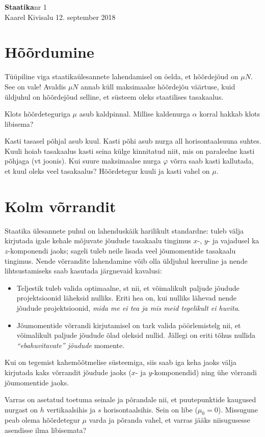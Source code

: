 \documentclass[a4paper,11pt,twocolumn]{article}
\begin{document}
{\huge \textbf{Staatika}\hfill \normalsize {nr 1}} \\
{Kaarel Kivisalu \hfill 12. september 2018}

\section{Hõõrdumine}
Tüüpiline viga staatikaülesannete lahendamisel on öelda, et hõõrdejõud on $\mu N$. See on vale! Avaldis $\mu N$ annab küll maksimaalse hõõrdejõu väärtuse, kuid üldjuhul on hõõrdejõud selline, et süsteem oleks staatilises tasakaalus.
\begin{question}
Klots hõõrdeteguriga $\mu$ asub kaldpinnal. Millise kaldenurga $\alpha$ korral hakkab klots libisema?
\end{question}
\begin{question}[Lahtine 2006, V7][sta1][5cm]
	Kasti tasasel põhjal asub kuul. Kasti põhi asub nurga all horisontaalsuuna suhtes. Kuuli hoiab tasakaalus kasti seina külge kinnitatud niit, mis on paraleelne kasti põhjaga (vt joonis). Kui suure maksimaalse nurga $ \varphi $ võrra saab kasti kallutada, et kuul oleks veel tasakaalus? Hõõrdetegur kuuli ja kasti vahel on $ \mu $.
\end{question}

\section{Kolm võrrandit}
Staatika ülesannete puhul on lahenduskäik harilikult standardne: tuleb välja kirjutada igale kehale mõjuvate jõudude tasakaalu tingimus $x$-, $y$- ja vajadusel ka $z$-komponendi jaoks; sageli tuleb neile lisada veel jõumomentide tasakaalu tingimus. Nende võrrandite lahendamine  võib olla üldjuhul keeruline ja nende lihtsustamiseks saab kasutada järgnevaid kavalusi:
\begin{itemize}
	\item Teljestik tuleb valida optimaalne, st nii, et võimalikult paljude jõudude projektsioonid läheksid nulliks. Eriti hea on, kui nulliks lähevad nende jõudude projektsioonid, \textit{mida me ei tea ja mis meid tegelikult ei huvita}.
	\item Jõumomentide võrrandi kirjutamisel on tark valida pöörlemistelg nii, et võimalikult paljude jõudude õlad oleksid nullid. Jällegi on eriti tõhus nullida \textit{“ebahuvitavate” jõudude} momente.
\end{itemize}
Kui on tegemist kahemõõtmelise süsteemiga, siis saab iga keha jaoks välja kirjutada kaks võrrandit jõudude jaoks ($ x $- ja $ y $-komponendid) ning ühe võrrandi jõumomentide jaoks.
\begin{question}
	Varras on asetatud toetuma seinale ja põrandale nii, et puutepunktide kaugused nurgast on $h$ vertikaalsihis ja $s$ horisontaalsihis. Sein on libe ($\mu_0=0$). Missugune peab olema hõõrdetegur $\mu$ varda ja põranda vahel, et varras jääks niisugusesse asendisse ilma libisemata?
\end{question}
\end{document}
